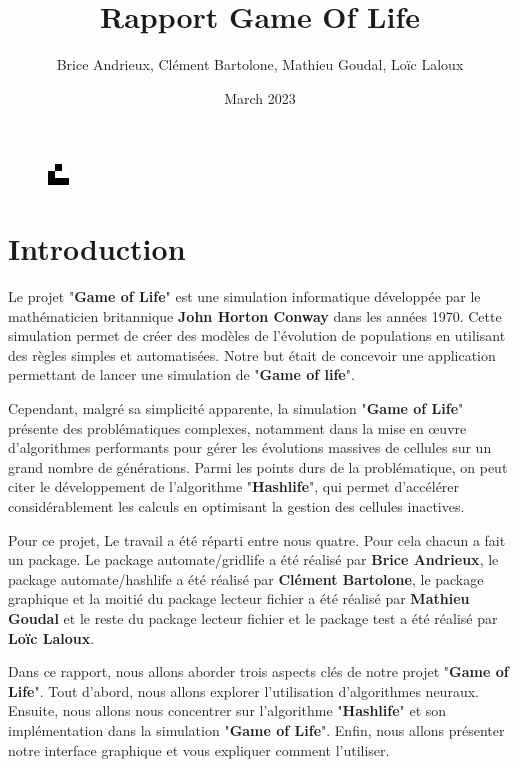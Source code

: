 \documentclass[12pt]{article}
\title{Rapport Game Of Life}
\author{Brice Andrieux, Clément Bartolone, Mathieu Goudal, Loïc Laloux}
\date{March 2023}
\begin{document}
\maketitle
    \begin{figure}[htp]
        \center
        \includegraphics[scale=16]{images/glider.png}
    \end{figure}
    
\newpage
    \tableofcontents
\newpage

\section{Introduction}
\par Le projet "\textbf{Game of Life}" est une simulation informatique développée par le mathématicien britannique \textbf{John Horton Conway} dans les années 1970. Cette simulation permet de créer des modèles de l'évolution de populations en utilisant des règles simples et automatisées. Notre but était de concevoir une application permettant de lancer une simulation de "\textbf{Game of life}".
\par Cependant, malgré sa simplicité apparente, la simulation "\textbf{Game of Life}" présente des problématiques complexes, notamment dans la mise en œuvre d'algorithmes performants pour gérer les évolutions massives de cellules sur un grand nombre de générations. Parmi les points durs de la problématique, on peut citer le développement de l'algorithme "\textbf{Hashlife}", qui permet d'accélérer considérablement les calculs en optimisant la gestion des cellules inactives.
\par Pour ce projet, Le travail a été réparti entre nous quatre. Pour cela chacun a fait un package. Le package automate/gridlife a été réalisé par \textbf{Brice Andrieux}, le package automate/hashlife a été réalisé par \textbf{Clément Bartolone}, le package graphique et la moitié du package lecteur fichier a été réalisé par \textbf{Mathieu Goudal} et le reste du package lecteur fichier et le package test a été réalisé par \textbf{Loïc Laloux}.  
\par Dans ce rapport, nous allons aborder trois aspects clés de notre projet "\textbf{Game of Life}". Tout d'abord, nous allons explorer l'utilisation d'algorithmes neuraux. Ensuite, nous allons nous concentrer sur l'algorithme "\textbf{Hashlife}" et son implémentation dans la simulation "\textbf{Game of Life}". Enfin, nous allons présenter notre interface graphique et vous expliquer comment l'utiliser.






\end{document}
